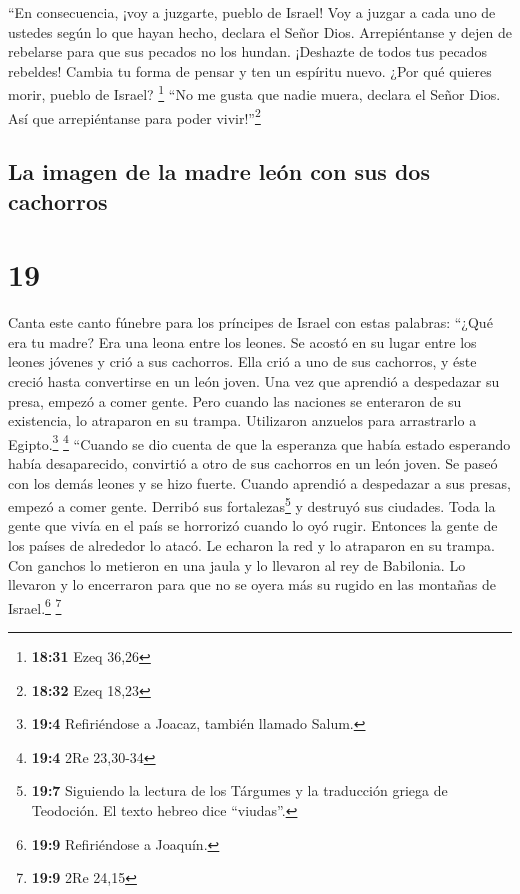  ``En consecuencia, ¡voy a juzgarte, pueblo de Israel!
Voy a juzgar a cada uno de ustedes según lo que hayan hecho, declara el
Señor Dios. Arrepiéntanse y dejen de rebelarse para que sus pecados no
los hundan.  ¡Deshazte de todos tus pecados rebeldes!
Cambia tu forma de pensar y ten un espíritu nuevo. ¿Por qué quieres
morir, pueblo de Israel? \footnote{\textbf{18:31} Ezeq 36,26}
 ``No me gusta que nadie muera, declara el Señor Dios.
Así que arrepiéntanse para poder vivir!''\footnote{\textbf{18:32} Ezeq
  18,23}

\hypertarget{la-imagen-de-la-madre-leuxf3n-con-sus-dos-cachorros}{%
\subsection{La imagen de la madre león con sus dos
cachorros}\label{la-imagen-de-la-madre-leuxf3n-con-sus-dos-cachorros}}

\hypertarget{section-18}{%
\section{19}\label{section-18}}

 Canta este canto fúnebre para los príncipes de Israel
 con estas palabras: ``¿Qué era tu madre? Era una leona
entre los leones. Se acostó en su lugar entre los leones jóvenes y crió
a sus cachorros.  Ella crió a uno de sus cachorros, y éste
creció hasta convertirse en un león joven. Una vez que aprendió a
despedazar su presa, empezó a comer gente.  Pero cuando
las naciones se enteraron de su existencia, lo atraparon en su trampa.
Utilizaron anzuelos para arrastrarlo a Egipto.\footnote{\textbf{19:4}
  Refiriéndose a Joacaz, también llamado Salum.} \footnote{\textbf{19:4}
  2Re 23,30-34}  ``Cuando se dio cuenta de que la
esperanza que había estado esperando había desaparecido, convirtió a
otro de sus cachorros en un león joven.  Se paseó con los
demás leones y se hizo fuerte. Cuando aprendió a despedazar a sus
presas, empezó a comer gente.  Derribó sus
fortalezas\footnote{\textbf{19:7} Siguiendo la lectura de los Tárgumes y
  la traducción griega de Teodoción. El texto hebreo dice ``viudas''.} y
destruyó sus ciudades. Toda la gente que vivía en el país se horrorizó
cuando lo oyó rugir.  Entonces la gente de los países de
alrededor lo atacó. Le echaron la red y lo atraparon en su trampa.
 Con ganchos lo metieron en una jaula y lo llevaron al rey
de Babilonia. Lo llevaron y lo encerraron para que no se oyera más su
rugido en las montañas de Israel.\footnote{\textbf{19:9} Refiriéndose a
  Joaquín.} \footnote{\textbf{19:9} 2Re 24,15}

